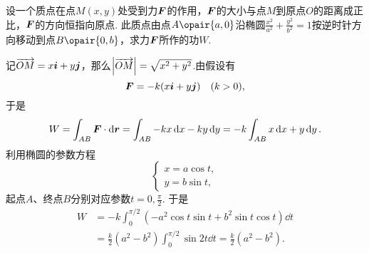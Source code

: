 \begin{example}
设一个质点在点\(M(x,y)\)处受到力\(\boldsymbol{F}\)的作用，\(\boldsymbol{F}\)的大小与点\(M\)到原点\(O\)的距离成正比，\(\boldsymbol{F}\)的方向恒指向原点.
此质点由点\(A\opair{a,0}\)沿椭圆\(\frac{x^2}{a^2}+\frac{y^2}{b^2}=1\)按逆时针方向移动到点\(B\opair{0,b}\)，求力\(\boldsymbol{F}\)所作的功\(W\).
\begin{solution}
记\(\overrightarrow{OM} = x\boldsymbol{i}+y\boldsymbol{j}\)，那么\(\abs{\overrightarrow{OM}} = \sqrt{x^2+y^2}\).由假设有\[
\boldsymbol{F} = -k(x\boldsymbol{i}+y\boldsymbol{j}) \quad (k>0),
\]于是\[
W = \int_{AB} \boldsymbol{F} \cdot \dd{\boldsymbol{r}}
= \int_{AB} -kx\dd{x}-ky\dd{y}
= -k \int_{AB} x\dd{x}+y\dd{y}.
\]利用椭圆的参数方程\[
\begin{cases}
x = a \cos t, \\
y = b \sin t,
\end{cases}
\]起点\(A\)、终点\(B\)分别对应参数\(t = 0,\frac{\pi}{2}\).
于是\begin{align*}
W &= -k \int_0^{\pi/2} (-a^2 \cos t \sin t + b^2 \sin t \cos t) \dd{t} \\
&= \frac{k}{2}(a^2-b^2) \int_0^{\pi/2} \sin 2t \dd{t}
= \frac{k}{2}(a^2-b^2).
\end{align*}
\end{solution}
\end{example}
